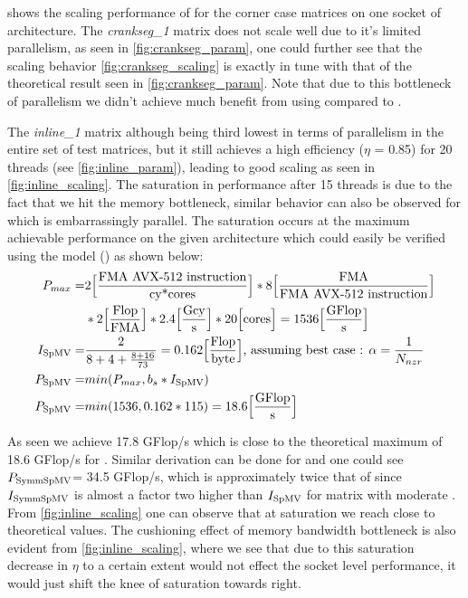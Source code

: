  shows the scaling performance of \SymmSpmv for the corner case matrices on one socket of \SKX architecture. The \emph{crankseg\_1} matrix does not scale well due to it's limited parallelism, as seen in \cref{fig:crankseg_param}, one could further see that the scaling behavior \cref{fig:crankseg_scaling} is exactly in tune with that of the theoretical result seen in \cref{fig:crankseg_param}. Note that due to this bottleneck of parallelism we didn't achieve much benefit from using \SymmSpmv compared to \SpMV.

The \emph{inline\_1} matrix although being third lowest in terms of parallelism in the entire set of test matrices, but it still achieves a high efficiency ($\eta$ = 0.85) for 20 threads (see \cref{fig:inline_param}), leading to good scaling as seen in \cref{fig:inline_scaling}. The saturation in performance after 15 threads is due to the fact that we hit the memory bottleneck, similar behavior can also be observed for \SpMV which is embarrassingly parallel. The saturation occurs at the maximum achievable performance on the given architecture which could easily be verified using the \roofline model (\cite{Williams_roofline}) as shown below:
\begin{align*}
	 P_{max} =&  2 \Big[\frac{\mbox{FMA AVX-512 instruction}}{\mbox{cy*cores}}\Big]  * 8 \Big[\frac{\mbox{FMA}}{\mbox{FMA AVX-512 instruction}}\Big] \\
	 & * 2 \Big[\frac{\mbox{Flop}}{\mbox{FMA}}\Big] * 2.4 \Big[\frac{\mbox{Gcy}}{\mbox{s}}\Big] * 20 \Big[\mbox{cores}\Big] = 1536  \Big[\frac{\mbox{GFlop}}{\mbox{s}}\Big] \\	 
	 I_\mathrm{SpMV} =& \frac{2}{8+4+\frac{8+16}{73}} = 0.162 \Big[\frac{\mbox{Flop}}{\mbox{byte}}\Big] \text{, assuming best case : $\alpha = \frac{1}{N_{nzr}}$}\\
	 P_\mathrm{SpMV} =& min(P_{max}, b_s*I_\mathrm{SpMV})\\
	 P_\mathrm{SpMV} =& min ( 1536, 0.162*115) = 18.6 \Big[\frac{\mbox{GFlop}}{\mbox{s}}\Big]
\end{align*}

As seen we achieve 17.8 GFlop/s which is close to the theoretical maximum of 18.6 GFlop/s for \SpMV. Similar derivation can be done for \SymmSpmv and one could see $P_\mathrm{SymmSpMV}$= 34.5 GFlop/s, which is approximately twice that of \SpMV since $I_\mathrm{SymmSpMV}$ is almost a factor two higher than $I_\mathrm{SpMV}$ for matrix with moderate \NNZR. From \cref{fig:inline_scaling} one can observe that at saturation we reach close to theoretical values. The cushioning effect of memory bandwidth bottleneck is also evident from \cref{fig:inline_scaling}, where we see that due to this saturation decrease in $\eta$ to a certain extent would not effect the socket level performance, it would just shift the knee of saturation towards right.

